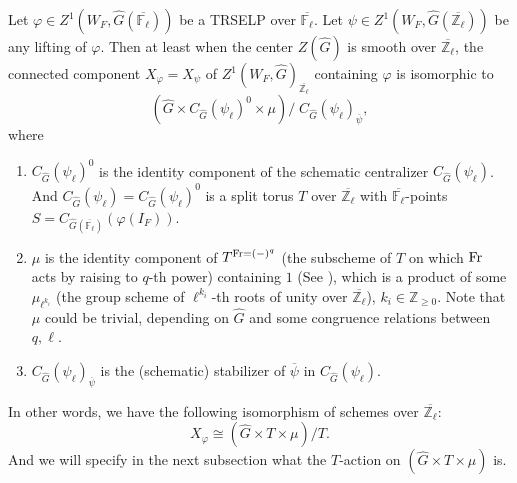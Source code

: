 \begin{theorem}\label{Thm X}
	Let $\varphi \in Z^1(W_F, \hat{G}(\overline{\mathbb{F}_{\ell}}))$ be a TRSELP over $\overline{\mathbb{F}_{\ell}}$. Let $\psi \in Z^1(W_F, \hat{G}(\overline{\mathbb{Z}_{\ell}}))$ be any lifting of $\varphi$. Then at least when the center $Z(\hat{G})$ is smooth over $\overline{\mathbb{Z}_{\ell}}$, the connected component $X_{\varphi}=X_{\psi}$ of $Z^1(W_F, \hat{G})_{\overline{\mathbb{Z}_{\ell}}}$ containing $\varphi$ is isomorphic to 
	$$\left(\hat{G} \times C_{\hat{G}}(\psi_{\ell})^0 \times \mu\right)/\;C_{\hat{G}}(\psi_{\ell})_{\overline{\psi}},$$
	where
	\begin{enumerate}
		\item $C_{\hat{G}}(\psi_{\ell})^0$ is the identity component of the schematic centralizer $C_{\hat{G}}(\psi_{\ell})$. And $C_{\hat{G}}(\psi_{\ell})=C_{\hat{G}}(\psi_{\ell})^0$ is a split torus $T$ over $\overline{\mathbb{Z}_{\ell}}$ with $\overline{\mathbb{F}_{\ell}}$-points $S=C_{\hat{G}(\overline{\mathbb{F}_{\ell}})}(\varphi(I_F))$.
		\item $\mu$ is the identity component of $T^{\operatorname{Fr}=(-)^q}$ (the subscheme of $T$ on which $\operatorname{Fr}$ acts by raising to $q$-th power) containing $1$ (See \cite[Example 3.14]{dat2022ihes}), which is a product of some $\mu_{\ell^{k_i}}$ (the group scheme of $\ell^{k_i}$-th roots of unity over $\overline{\mathbb{Z}_{\ell}}$), $k_i \in \mathbb{Z}_{\geq 0}$. Note that $\mu$ could be trivial, depending on $\hat{G}$ and some congruence relations between $q, \ell$.
		\item $C_{\hat{G}}(\psi_{\ell})_{\overline{\psi}}$ is the (schematic) stabilizer of $\overline{\psi}$ in $C_{\hat{G}}(\psi_{\ell})$.
	\end{enumerate}
    In other words, we have the following isomorphism of schemes over $\overline{\mathbb{Z}_{\ell}}$:
    $$X_{\varphi} \cong \left(\hat{G} \times T \times \mu\right)/T.$$
    And we will specify in the next subsection what the $T$-action on $\left(\hat{G} \times T \times \mu\right)$ is.
    

\end{theorem}
